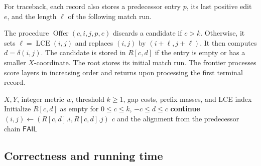 \documentclass[11pt]{article}
\theoremstyle{remark}
\newcommand{\lce}{\operatorname{LCE}}
\newcommand{\Offer}{\operatorname{Offer}}
\newcommand{\FAIL}{\mathsf{FAIL}}
\begin{document}
For traceback, each record also stores a predecessor entry $p$,
its last positive edit $e$, and the length $\ell$ of the following
match run.

The procedure $\Offer(c,i,j,p,e)$ discards a candidate if $c>k$.
Otherwise, it sets $\ell=\lce(i,j)$ and replaces $(i,j)$ by
$(i+\ell,j+\ell)$. It then computes $d=\delta(i,j)$.
The candidate is stored in $R[c,d]$ if the entry is empty or has a
smaller $X$-coordinate. The root stores its initial match run.
The frontier processes score layers in increasing
order and returns upon processing the first terminal record.

\begin{algorithm}[H]
\caption{Bounded weighted edit distance}\label{alg:frontier}
\begin{algorithmic}[1]
\Require $X,Y$, integer metric $w$, threshold $k\ge1$, gap costs,
prefix masses, and LCE index
  \State Initialize $R[c,d]$ as empty for $0\le c\le k$, $-c\le d\le c$
  \State {}
       \State \textbf{continue} \EndIf
      \State $(i,j)\gets(R[c,d].i,R[c,d].j)$
        \State \Return $c$ and the alignment from the predecessor chain
      \EndIf
        \State {}
      \EndFor
    \EndFor
  \EndFor
  \State \Return $\FAIL$
\EndFunction
\end{algorithmic}
\end{algorithm}

\subsection{Correctness and running time}\label{sec:traceback}
\end{document}
